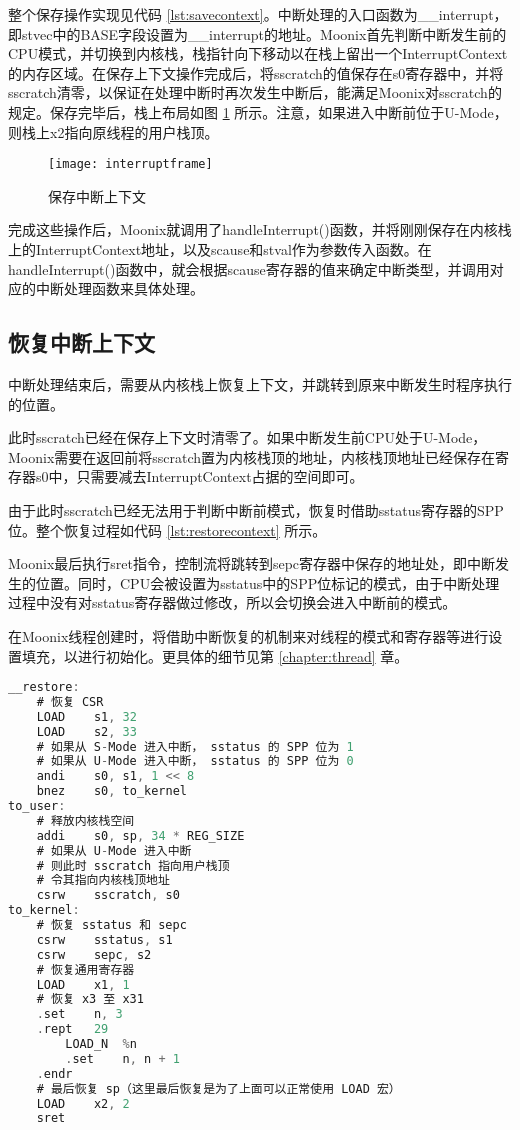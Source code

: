 整个保存操作实现见代码 \ref{lst:savecontext}。中断处理的入口函数为\_\_interrupt，即stvec中的BASE字段设置为\_\_interrupt的地址。Moonix首先判断中断发生前的CPU模式，并切换到内核栈，栈指针向下移动以在栈上留出一个InterruptContext的内存区域。在保存上下文操作完成后，将sscratch的值保存在s0寄存器中，并将sscratch清零，以保证在处理中断时再次发生中断后，能满足Moonix对sscratch的规定。保存完毕后，栈上布局如图 \ref{pic:interruptframe} 所示。注意，如果进入中断前位于U-Mode，则栈上x2指向原线程的用户栈顶。

\begin{figure}[htpb]
	\centering
	\texttt{[image: interruptframe]}
	\setlength{\abovecaptionskip}{2pt}
	\caption{保存中断上下文}
	\label{pic:interruptframe}
\end{figure}

完成这些操作后，Moonix就调用了handleInterrupt()函数，并将刚刚保存在内核栈上的InterruptContext地址，以及scause和stval作为参数传入函数。在handleInterrupt()函数中，就会根据scause寄存器的值来确定中断类型，并调用对应的中断处理函数来具体处理。

\subsection{恢复中断上下文}

中断处理结束后，需要从内核栈上恢复上下文，并跳转到原来中断发生时程序执行的位置。

此时sscratch已经在保存上下文时清零了。如果中断发生前CPU处于U-Mode，Moonix需要在返回前将sscratch置为内核栈顶的地址，内核栈顶地址已经保存在寄存器s0中，只需要减去InterruptContext占据的空间即可。

由于此时sscratch已经无法用于判断中断前模式，恢复时借助sstatus寄存器的SPP位。整个恢复过程如代码 \ref{lst:restorecontext} 所示。

Moonix最后执行sret指令，控制流将跳转到sepc寄存器中保存的地址处，即中断发生的位置。同时，CPU会被设置为sstatus中的SPP位标记的模式，由于中断处理过程中没有对sstatus寄存器做过修改，所以会切换会进入中断前的模式。

在Moonix线程创建时，将借助中断恢复的机制来对线程的模式和寄存器等进行设置填充，以进行初始化。更具体的细节见第 \ref{chapter:thread} 章。

\clearpage

\begin{lstlisting}[language={C}, caption={恢复中断上下文}, label={lst:restorecontext}]
__restore:
	# 恢复 CSR
	LOAD    s1, 32
	LOAD    s2, 33
	# 如果从 S-Mode 进入中断， sstatus 的 SPP 位为 1
	# 如果从 U-Mode 进入中断， sstatus 的 SPP 位为 0
	andi    s0, s1, 1 << 8
	bnez    s0, to_kernel
to_user:
	# 释放内核栈空间
	addi    s0, sp, 34 * REG_SIZE
	# 如果从 U-Mode 进入中断
	# 则此时 sscratch 指向用户栈顶
	# 令其指向内核栈顶地址
	csrw    sscratch, s0
to_kernel:
	# 恢复 sstatus 和 sepc
	csrw    sstatus, s1
	csrw    sepc, s2
	# 恢复通用寄存器
	LOAD    x1, 1
	# 恢复 x3 至 x31
	.set    n, 3
	.rept   29
		LOAD_N  %n
		.set    n, n + 1
	.endr
	# 最后恢复 sp（这里最后恢复是为了上面可以正常使用 LOAD 宏）
	LOAD    x2, 2
	sret
\end{lstlisting}

